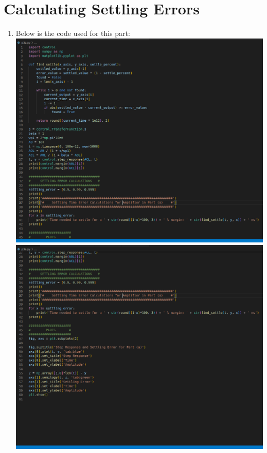\documentclass[12pt, fleqn]{article}
\begin{document}
\section{Calculating Settling Errors}
    \begin{enumerate}[label=(\alph*)]
        \item
        {
        Below is the code used for this part:\\[0.25cm]
        \includegraphics[scale=0.3, center]{p3a_code1.PNG}\\[0.25cm]
        \includegraphics[scale=0.3, center]{p3a_code2.PNG}\\[0.25cm]
}
\end{enumerate}
\end{document}
